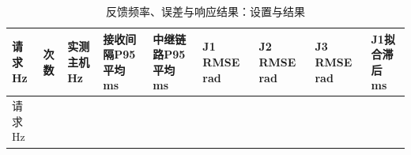 \FloatBarrier\begingroup\footnotesize\setlength{\tabcolsep}{2pt}
\begin{longtable}[]{@{}
  >{\raggedright\arraybackslash}p{}
  >{\raggedleft\arraybackslash}p{}
  >{\raggedleft\arraybackslash}p{}
  >{\raggedleft\arraybackslash}p{}
  >{\raggedleft\arraybackslash}p{}
  >{\raggedleft\arraybackslash}p{}
  >{\raggedleft\arraybackslash}p{}
  >{\raggedleft\arraybackslash}p{}
  >{\raggedleft\arraybackslash}p{}@{}}
\caption{反馈频率、误差与响应结果：设置与结果}\label{tab:s05-2}\tabularnewline
\toprule\noalign{}
\begin{minipage}[b]{\linewidth}\raggedright
请求Hz
\end{minipage} & \begin{minipage}[b]{\linewidth}\raggedleft
次数
\end{minipage} & \begin{minipage}[b]{\linewidth}\raggedleft
实测主机Hz
\end{minipage} & \begin{minipage}[b]{\linewidth}\raggedleft
接收间隔P95平均 ms
\end{minipage} & \begin{minipage}[b]{\linewidth}\raggedleft
中继链路P95平均 ms
\end{minipage} & \begin{minipage}[b]{\linewidth}\raggedleft
J1 RMSE rad
\end{minipage} & \begin{minipage}[b]{\linewidth}\raggedleft
J2 RMSE rad
\end{minipage} & \begin{minipage}[b]{\linewidth}\raggedleft
J3 RMSE rad
\end{minipage} & \begin{minipage}[b]{\linewidth}\raggedleft
J1拟合滞后 ms
\end{minipage} \\
\midrule\noalign{}
\endfirsthead
\toprule\noalign{}
\begin{minipage}[b]{\linewidth}\raggedright
请求Hz
\end{minipage} & \begin{minipage}[b]{\linewidth}\raggedleft

\end{minipage}
\end{longtable}
